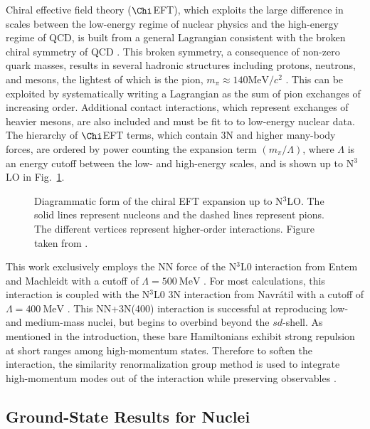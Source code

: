 \documentclass[thesis.tex]{subfiles}
\begin{document}
Chiral effective field theory ($\Chi$EFT), which exploits the large difference in scales between the low-energy regime of nuclear physics and the high-energy regime of QCD, is built from a general Lagrangian consistent with the broken chiral symmetry of QCD \cite{EPELBAUM20091773,MACHLEIDT2016}.  This broken symmetry, a consequence of non-zero quark masses, results in several hadronic structures including protons, neutrons, and mesons, the lightest of which is the pion, $m_{\pi}\approx 140\mathrm{MeV}/c^{2}$ \cite{BERINGER2012}.  This can be exploited by systematically writing a Lagrangian as the sum of pion exchanges of increasing order.  Additional contact interactions, which represent exchanges of heavier mesons, are also included and must be fit to to low-energy nuclear data.  The hierarchy of $\Chi$EFT terms, which contain 3N and higher many-body forces, are ordered by power counting the expansion term $(m_{\pi}/\Lambda)$, where $\Lambda$ is an energy cutoff between the low- and high-energy scales, and is shown up to N$^{3}$LO in Fig.\ \ref{fig:Chiral_Forces}.
\begin{figure}[h]
  \centering
  \caption{Diagrammatic form of the chiral EFT expansion up to N$^{3}$LO.  The solid lines represent nucleons and the dashed lines represent pions.  The different vertices represent higher-order interactions.  Figure taken from  \cite{MACHLEIDT2016}.}  
  \label{fig:Chiral_Forces}
\end{figure}

This work exclusively employs the NN force of the N$^{3}$L0 interaction from Entem and Machleidt with a cutoff of $\Lambda=500\ \mathrm{MeV}$ \cite{ENTEM2003}.  For most calculations, this interaction is coupled with the N$^{3}$L0 3N interaction from Navr\'{a}til with a cutoff of $\Lambda=400\ \mathrm{MeV}$ \cite{NAVRATIL2007}.  This NN+3N(400) interaction is successful at reproducing low- and medium-mass nuclei, but begins to overbind beyond the $sd$-shell.  As mentioned in the introduction, these bare Hamiltonians exhibit strong repulsion at short ranges among high-momentum states.  Therefore to soften the interaction, the similarity renormalization group method is used to integrate high-momentum modes out of the interaction while preserving observables \cite{BOGNER201094,ROTH2011072501}.


\subsection{Ground-State Results for Nuclei} \label{section:nuclear_results}
\end{document}
